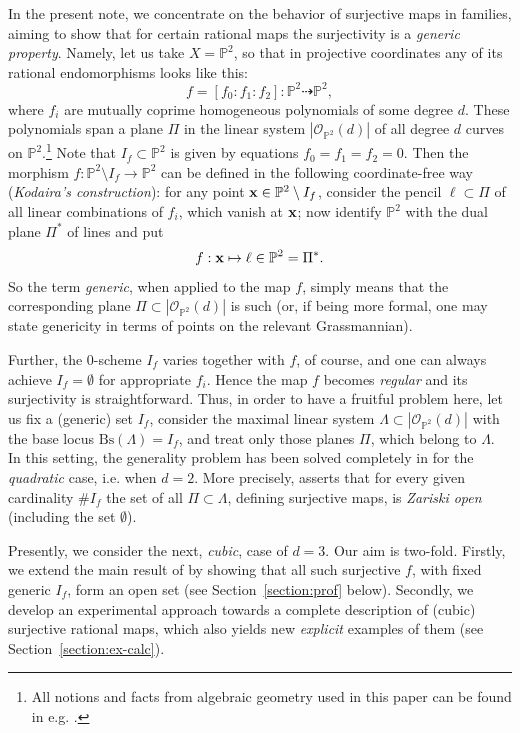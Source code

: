 \documentclass[14pt]{amsart}
\theoremstyle{definition}
\theoremstyle{remark}
\newcommand{\p}{\mathbb{P}}
\newcommand{\map}{\longrightarrow}
\begin{document}
In the present note, we concentrate on the behavior of surjective
maps in families, aiming to show that for certain rational maps
the surjectivity is a \emph{generic property}. Namely, let us take
$X = \p^2$, so that in projective coordinates any of its rational
endomorphisms looks like this:
$$
f = [f_0: f_1: f_2]: \p^2 \dashrightarrow \p^2,
$$
where $f_i$ are mutually coprime homogeneous polynomials of some
degree $d$. These polynomials span a plane $\Pi$ in the linear
system $|\mathcal{O}_{\p^2}(d)|$ of all degree $d$ curves on
$\p^2$.\footnote{All notions and facts from algebraic geometry
used in this paper can be found in e.g. \cite{Dol-CAG}.} Note that
$I_f \subset \p^2$ is given by equations $f_0 = f_1 = f_2 = 0$.
Then the morphism $f: \p^2 \setminus I_f \map \p^2$ can be defined
in the following coordinate-free way (\emph{Kodaira's
construction}): for any point ${\bf x} \in \p^2 \setminus I_f$,
consider the pencil $\ell \subset \Pi$ of all linear combinations
of $f_i$, which vanish at ${\bf x}$; now identify $\p^2$ with the
dual plane $\Pi^*$ of lines and put
$$
f: {\bf x} \mapsto \ell \in \p^2 = \Pi^*.
$$
So the term \emph{generic}, when applied to the map $f$, simply
means that the corresponding plane $\Pi \subset
|\mathcal{O}_{\p^2}(d)|$ is such (or, if being more formal, one
may state genericity in terms of points on the relevant
Grassmannian).

Further, the $0$-scheme $I_f$ varies together with $f$, of course,
and one can always achieve $I_f = \emptyset$ for appropriate
$f_i$. Hence the map $f$ becomes \emph{regular} and its
surjectivity is straightforward. Thus, in order to have a fruitful
problem here, let us fix a (generic) set $I_f$, consider the
maximal linear system $\Lambda \subset  |\mathcal{O}_{\p^2}(d)|$
with the base locus $\text{Bs}(\Lambda) = I_f$, and treat only
those planes $\Pi$, which belong to $\Lambda$. In this setting,
the generality problem has been solved completely in
\cite{Kul-Zhd} for the \emph{quadratic} case, i.e. when $d = 2$.
More precisely, \cite[Theorem 2]{Kul-Zhd} asserts that for every
given cardinality $\#I_f$ the set of all $\Pi \subset \Lambda$,
defining surjective maps, is \emph{Zariski open} (including the
set $\emptyset$).

Presently, we consider the next, \emph{cubic}, case of $d = 3$.
Our aim is two-fold. Firstly, we extend the main result of
\cite{Kul-Zhd} by showing that all such surjective $f$, with fixed
generic $I_f$, form an open set (see Section~\ref{section:prof}
below). Secondly, we develop an experimental approach towards a
complete description of (cubic) surjective rational maps, which
also yields new \emph{explicit} examples of them (see
Section~\ref{section:ex-calc}).
\end{document}
